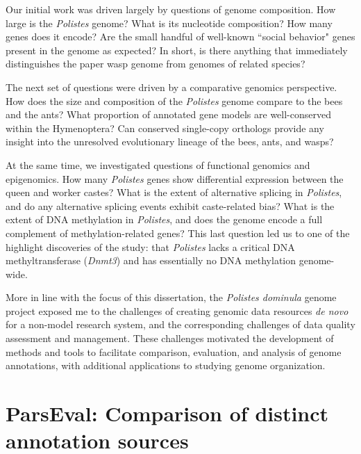 Our initial work was driven largely by questions of genome composition.
How large is the \textit{Polistes} genome?
What is its nucleotide composition?
How many genes does it encode?
Are the small handful of well-known ``social behavior" genes present in the genome as expected?
In short, is there anything that immediately distinguishes the paper wasp genome from genomes of related species?

The next set of questions were driven by a comparative genomics perspective.
How does the size and composition of the \textit{Polistes} genome compare to the bees and the ants?
What proportion of annotated gene models are well-conserved within the Hymenoptera?
Can conserved single-copy orthologs provide any insight into the unresolved evolutionary lineage of the bees, ants, and wasps?

At the same time, we investigated questions of functional genomics and epigenomics.
How many \textit{Polistes} genes show differential expression between the queen and worker castes?
What is the extent of alternative splicing in \textit{Polistes}, and do any alternative splicing events exhibit caste-related bias?
What is the extent of DNA methylation in \textit{Polistes}, and does the genome encode a full complement of methylation-related genes?
This last question led us to one of the highlight discoveries of the study: that \textit{Polistes} lacks a critical DNA methyltransferase (\textit{Dnmt3}) and has essentially no DNA methylation genome-wide.

More in line with the focus of this dissertation, the \textit{Polistes dominula} genome project exposed me to the challenges of creating genomic data resources \textit{de novo} for a non-model research system, and the corresponding challenges of data quality assessment and management.
These challenges motivated the development of methods and tools to facilitate comparison, evaluation, and analysis of genome annotations, with additional applications to studying genome organization.

\section{ParsEval: Comparison of distinct annotation sources}

